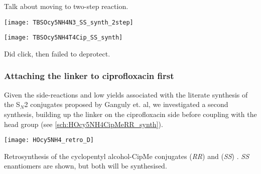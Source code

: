 
Talk about moving to two-step reaction.

\begin{scheme}[H]
	\begin{center}
				
		\texttt{[image: TBSOcy5NH4N3\_SS\_synth\_2step]}
		\caption{
		a) , , , 0 $^{\circ}$C, 3 h.
		b) , DMF, , r.t., 3 h. 
		99.2 \% over 2 steps. %
		\label{sch:TBSOcy5NH4N3_SS_synth_2step}}
	\end{center}
\end{scheme}

\begin{scheme}[H]
	\begin{center}
		\texttt{[image: TBSOcy5NH4T4Cip\_SS\_synth]}
		\caption{
		a) , sodium ascorbate, THPTA, , \textit{t}-BuOH, r.t., 87.4 \%. %
		b) TBAF, THF, r.t., 5 d. %
		\label{sch:TBSOcy5NH4T4Cip_SS_synth}}
	\end{center}
\end{scheme}

Did click, then failed to deprotect.

\subsubsection{Attaching the linker to ciprofloxacin first\label{sec:CipMe_linker}}

Given the side-reactions and low yields associated with the literate synthesis of the S$_N$2 conjugates proposed by Ganguly et. al\cite{Ganguly2011}, we investigated a second synthesis, building up the linker on the ciprofloxacin side before coupling with the head group (see \ref{sch:HOcy5NH4CipMeRR_synth}).

\begin{scheme}[H]
	\begin{center}
		\texttt{[image: HOcy5NH4\_retro\_D]}
		\caption{Retrosynthesis of the cyclopentyl alcohol-CipMe conjugates (\textit{RR})  and (\textit{SS}) . \textit{SS} enantiomers are shown, but both will be synthesised.\label{sch:HOcy5NH4_retro_D}}
	\end{center}
\end{scheme}

